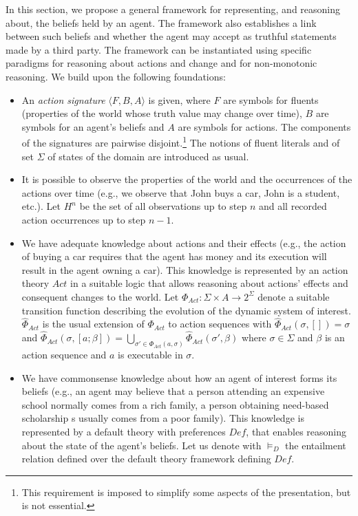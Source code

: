 \documentclass{article}
\begin{document}
In this section, we propose a general framework for representing, and reasoning about, the beliefs held by an agent. The framework also establishes a link between such beliefs and whether the agent may accept as truthful statements made by a third party. The
framework  can be instantiated using specific paradigms for reasoning about actions and change and for non-monotonic reasoning. We build upon the following foundations:
%
 \begin{itemize}
%
\item An \emph{action signature} $\langle F,B,A \rangle$ is given, where $F$ are symbols for fluents (properties of the world whose truth value may change over time),
        $B$ are symbols for an agent's beliefs and $A$ are symbols for actions. The components of the signatures are pairwise disjoint.\footnote{This requirement is imposed to simplify some aspects of the presentation, but is not essential.} The notions of fluent literals and of set $\Sigma$ of states of the domain are introduced as usual.
\item It is possible to  observe the properties of the world and the occurrences of the actions    over time
        (e.g., we observe that John buys a car, John is a student, etc.). 
        Let $H^n$ be the set of all observations up to step $n$ and all recorded action occurrences up to step $n-1$.
 
\item We have adequate knowledge about actions  and their effects (e.g., the action of buying a car requires that the agent has money and its execution will result in the agent owning a car). This knowledge is represented by an action theory $Act$ in a suitable logic that allows reasoning about actions' effects and consequent changes to the world. 
        Let $\Phi_{Act}: \Sigma \times A \rightarrow 2^\Sigma$ denote a suitable transition function describing the evolution of the dynamic system of interest. $\hat\Phi_{Act}$ is the usual extension of $\Phi_{Act}$ to action sequences with $\hat\Phi_{Act}(\sigma, []) = \sigma$ and 
$\hat\Phi_{Act}(\sigma, [a; \beta]) = \bigcup_{\sigma' \in \Phi_{Act}(a, \sigma)} \hat\Phi_{Act}(\sigma', \beta)$ where $\sigma \in \Sigma$ and $\beta$ is an action sequence  and $a$ is executable in $\sigma$.                 

\item We have commonsense knowledge about how an agent of interest forms its beliefs (e.g., an agent may believe that a person attending an expensive school normally comes from a rich family, a person obtaining need-based scholarship s  usually comes from a poor family).
This knowledge is represented by a default theory with preferences $\textit{Def}$,  that enables reasoning about the state of the agent's beliefs. Let us denote with $\models_D$ the entailment relation defined over the default theory framework defining $\textit{Def}$.  
 
\end{itemize} 
\end{document}
